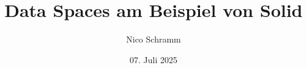 
\title{Data Spaces am Beispiel von Solid}
\author{Nico Schramm}

\newcommand{\subject}{Handout zum Oberseminar-Vortrag}
\date{07. Juli 2025}
